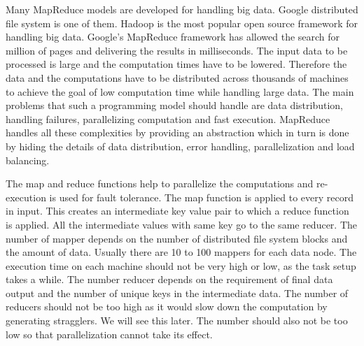 \documentclass[sigconf]{acmart}
\begin{document}
\par Many MapReduce models are developed for handling big data. Google distributed file system is one of them. Hadoop is the most popular open source framework for handling big data. Google's MapReduce framework has allowed the search for million of pages and delivering the results in milliseconds. The input data to be processed is large and the computation times have to be lowered. Therefore the data and the computations have to be distributed across thousands of machines to achieve the goal of low computation time while handling large data. The main problems that such a programming model should handle are data distribution, handling failures, parallelizing computation and fast execution. MapReduce handles all these complexities by providing an abstraction which in turn is done by hiding the details of data distribution, error handling, parallelization and load balancing. 
\par The map and reduce functions help to parallelize the computations and re-execution is used for fault tolerance. The map function is applied to every record in input. This creates an intermediate key value pair to which a reduce function is applied. All the intermediate values with same key go to the same reducer. The number of mapper depends on the number of distributed file system blocks and the amount of data. Usually there are 10 to 100 mappers for each data node. The execution time on each machine should not be very high or low, as the task setup takes a while. The number reducer depends on the requirement of final data output and the number of unique keys in the intermediate data. The number of reducers should not be too high as it would slow down the computation by generating stragglers. We will see this later. The number should also not be too low so that parallelization cannot take its effect. 
\end{document}
